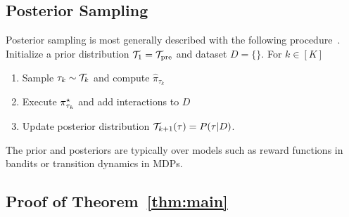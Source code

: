 \subsection{Posterior Sampling}

Posterior sampling is most generally described with the following procedure~\citep{osband2013more}. Initialize a prior distribution ${\mathcal{T}}_1 = {\mathcal{T}}_{\text{pre}}$ and dataset $D = \{\}$. For $k \in [K]$
\begin{enumerate}
    \item Sample $\tau_k \sim {\mathcal{T}}_k$ and compute $\hat \pi_{\tau_k}   $
    \item Execute $\pi^{\star}_{\tau_k}$ and add interactions to $D$
    \item Update posterior distribution ${\mathcal{T}}_{k + 1}(\tau) = P( \tau | D)$.
\end{enumerate}
The prior and posteriors are typically over models such as reward functions in bandits or transition dynamics in MDPs.

\subsection{Proof of Theorem~\ref{thm:main}}

\thmmain*


